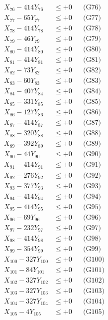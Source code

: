 \documentclass[a4paper,10pt]{article}
\begin{document}
{\begin{align}
X_{76} - 414Y_{76} &\leq +0 && \text{(G76)} \\
X_{77} - 65Y_{77} &\leq +0 && \text{(G77)} \\
X_{78} - 414Y_{78} &\leq +0 && \text{(G78)} \\
X_{79} - 46Y_{79} &\leq +0 && \text{(G79)} \\
X_{80} - 414Y_{80} &\leq +0 && \text{(G80)} \\
\allowbreak
X_{81} - 414Y_{81} &\leq +0 && \text{(G81)} \\
X_{82} - 73Y_{82} &\leq +0 && \text{(G82)} \\
X_{83} - 60Y_{83} &\leq +0 && \text{(G83)} \\
X_{84} - 407Y_{84} &\leq +0 && \text{(G84)} \\
X_{85} - 331Y_{85} &\leq +0 && \text{(G85)} \\
X_{86} - 127Y_{86} &\leq +0 && \text{(G86)} \\
X_{87} - 414Y_{87} &\leq +0 && \text{(G87)} \\
X_{88} - 320Y_{88} &\leq +0 && \text{(G88)} \\
X_{89} - 392Y_{89} &\leq +0 && \text{(G89)} \\
X_{90} - 44Y_{90} &\leq +0 && \text{(G90)} \\
\allowbreak
X_{91} - 414Y_{91} &\leq +0 && \text{(G91)} \\
X_{92} - 276Y_{92} &\leq +0 && \text{(G92)} \\
X_{93} - 377Y_{93} &\leq +0 && \text{(G93)} \\
X_{94} - 414Y_{94} &\leq +0 && \text{(G94)} \\
X_{95} - 414Y_{95} &\leq +0 && \text{(G95)} \\
X_{96} - 69Y_{96} &\leq +0 && \text{(G96)} \\
X_{97} - 232Y_{97} &\leq +0 && \text{(G97)} \\
X_{98} - 414Y_{98} &\leq +0 && \text{(G98)} \\
X_{99} - 354Y_{99} &\leq +0 && \text{(G99)} \\
X_{100} - 327Y_{100} &\leq +0 && \text{(G100)} \\
\allowbreak
X_{101} - 84Y_{101} &\leq +0 && \text{(G101)} \\
X_{102} - 327Y_{102} &\leq +0 && \text{(G102)} \\
X_{103} - 327Y_{103} &\leq +0 && \text{(G103)} \\
X_{104} - 327Y_{104} &\leq +0 && \text{(G104)} \\
X_{105} - 4Y_{105} &\leq +0 && \text{(G105)} \\

\end{align}}
\end{document}
